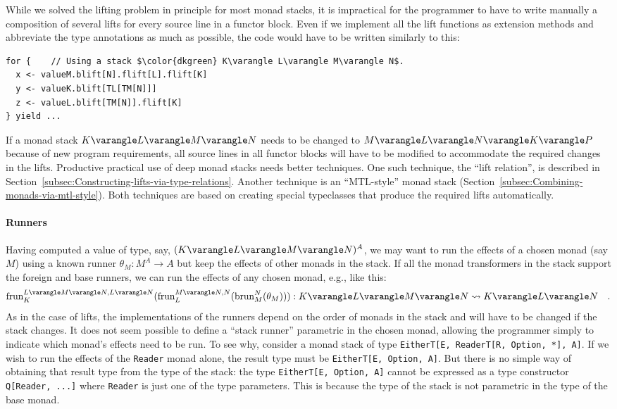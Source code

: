 While we solved the lifting problem in principle for most monad stacks,
it is impractical for the programmer to have to write manually a composition
of several lifts for every source line in a functor block. Even if
we implement all the lift functions as extension methods and abbreviate
the type annotations as much as possible, the code would have to be
written similarly to this:
\begin{lstlisting}[mathescape=true]
for {    // Using a stack $\color{dkgreen} K\varangle L\varangle M\varangle N$.
  x <- valueM.blift[N].flift[L].flift[K]
  y <- valueK.blift[TL[TM[N]]]
  z <- valueL.blift[TM[N]].flift[K]
} yield ...
\end{lstlisting}
If a monad stack $K\varangle L\varangle M\varangle N$ needs to be
changed to $M\varangle L\varangle N\varangle K\varangle P$ because
of new program requirements, all source lines in all functor blocks
will have to be modified to accommodate the required changes in the
lifts. Productive practical use of deep monad stacks needs better
techniques. One such technique, the \textsf{``}lift relation\textsf{''}, is described
in Section~\ref{subsec:Constructing-lifts-via-type-relations}. Another
technique is an \textsf{``}MTL-style\textsf{''} monad stack (Section~\ref{subsec:Combining-monads-via-mtl-style}).
Both techniques are based on creating special typeclasses that produce
the required lifts automatically.

\paragraph{Runners}

Having computed a value of type, say, $(K\varangle L\varangle M\varangle N)^{A}$,
we may want to run the effects of a chosen monad (say $M$) using
a known runner $\theta_{M}:M^{A}\rightarrow A$ but keep the effects
of other monads in the stack. If all the monad transformers in the
stack support the foreign and base runners, we can run the effects
of any chosen monad, e.g., like this:
\[
\text{frun}_{K}^{L\varangle M\varangle N,L\varangle N}(\text{frun}_{L}^{M\varangle N,N}(\text{brun}_{M}^{N}(\theta_{M}))):K\varangle L\varangle M\varangle N\leadsto K\varangle L\varangle N\quad.
\]
As in the case of lifts, the implementations of the runners depend
on the order of monads in the stack and will have to be changed if
the stack changes. It does not seem possible to define a \textsf{``}stack
runner\textsf{''} parametric in the chosen monad, allowing the programmer
simply to indicate which monad\textsf{'}s effects need to be run. To see why,
consider a monad stack of type \lstinline!EitherT[E, ReaderT[R, Option, *], A]!.
If we wish to run the effects of the \lstinline!Reader! monad alone,
the result type must be \lstinline!EitherT[E, Option, A]!. But there
is no simple way of obtaining that result type from the type of the
stack: the type \lstinline!EitherT[E, Option, A]! cannot be expressed
as a type constructor \lstinline!Q[Reader, ...]! where \lstinline!Reader!
is just one of the type parameters. This is because the type of the
stack is not parametric in the type of the base monad.

